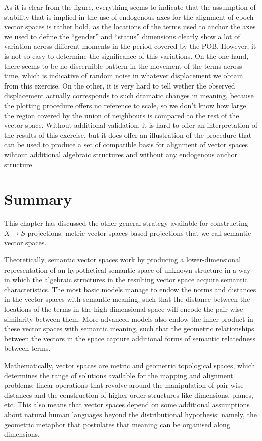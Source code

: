 As it is clear from the figure, everything seems to indicate that the assumption of stability that is implied in the use of endogenous axes for the alignment of epoch vector spaces is rather bold, as the locations of the terms used to anchor the axes we used to define the ``gender'' and ``status'' dimensions clearly show a lot of variation across different moments in the period covered by the POB.
However, it is not so easy to determine the significance of this variations.
On the one hand, there seems to be no discernible pattern in the movement of the terms across time, which is indicative of random noise in whatever displacement we obtain from this exercise.
On the other, it is very hard to tell wether the observed displacement actually corresponds to such dramatic changes in meaning, because the plotting procedure offers no reference to scale, so we don't know how large the region covered by the union of neighbours is compared to the rest of the vector space.
Without additional validation, it is hard to offer an interpretation of the results of this exercise, but it does offer an illustration of the procedure that can be used to produce a set of compatible basis for alignment of vector spaces wihtout additional algebraic structures and without any endogenous anchor structure.

\section{Summary}

This chapter has discussed the other general strategy available for constructing $X \rightarrow S$ projections: metric vector spaces based projections that we call semantic vector spaces.

Theoretically, semantic vector spaces work by producing a lower-dimensional representation of an hypothetical semantic space of unknown structure in a way in which the algebraic structures in the resulting vector space acquire semantic characteristics.
The most basic models manage to endow the norms and distances in the vector spaces with semantic meaning, such that the distance between the locations of the terms in the high-dimensional space will encode the pair-wise similarity between them.
More advanced models also endow the inner product in these vector spaces with semantic meaning, such that the geometric relationships between the vectors in the space capture additional forms of semantic relatedness between terms.

Mathematically, vector spaces are metric and geometric topological spaces, which determines the range of solutions available for the mapping and alignment problems: linear operations that revolve around the manipulation of pair-wise distances and the construction of higher-order structures like dimensions, planes, etc.
This also means that vector spaces depend on some additional assumptions about natural human languages beyond the distributional hypothesis: namely, the geometric metaphor that postulates that meaning can be organised along dimensions.

